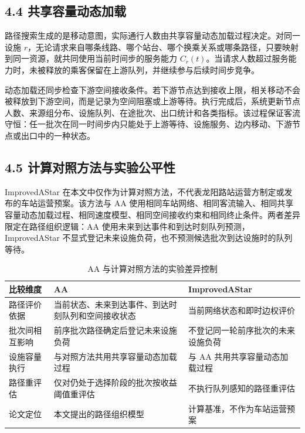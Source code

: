 \documentclass[UTF8,a4paper,12pt]{ctexart}
\begin{document}
\subsection{4.4 共享容量动态加载}

路径搜索生成的是移动意图，实际通行人数由共享容量动态加载过程决定。对同一设施 \(r\)，无论请求来自哪条线路、哪个站台、哪个换乘关系或哪条路径，只要映射到同一资源，就共同使用当前时间步的服务能力 \(C_r(t)\)。当请求人数超过服务能力时，未被释放的乘客保留在上游队列，并继续参与后续时间步竞争。

动态加载还同步检查下游空间接收条件。若下游节点达到接收上限，相关移动不会被释放到下游空间，而是记录为空间阻塞或上游等待。执行完成后，系统更新节点人数、来源组分布、设施队列、在途批次、出口统计和各类指标。该过程保证客流守恒：任一批次在同一时间步内只能处于上游等待、设施服务、边内移动、下游节点或出口中的一种状态。

\subsection{4.5 计算对照方法与实验公平性}

ImprovedAStar 在本文中仅作为计算对照方法，不代表龙阳路站运营方制定或发布的车站运营预案。该方法与 AA 使用相同车站网络、相同客流输入、相同共享容量动态加载过程、相同速度模型、相同空间接收约束和相同终止条件。两者差异限定在路径组织逻辑：AA 使用未来到达事件和到达时刻队列预测，ImprovedAStar 不显式登记未来设施负荷，也不预测候选批次到达设施时的队列等待。

\begin{table}[htbp]
\centering
\caption{AA 与计算对照方法的实验差异控制}
\small
\begin{tabular}{p{}p{}p{}}
\toprule
比较维度 & AA & ImprovedAStar \\
\midrule
路径评价依据 & 当前状态、未来到达事件、到达时刻队列和空间接收状态 & 当前网络状态和即时边权评价 \\
批次间相互影响 & 前序批次路径确定后登记未来设施负荷 & 不登记同一轮前序批次的未来设施负荷 \\
设施容量执行 & 与对照方法共用共享容量动态加载过程 & 与 AA 共用共享容量动态加载过程 \\
路径重评估 & 仅对仍处于选择阶段的批次按收益阈值重评估 & 不执行队列感知的路径重评估 \\
论文定位 & 本文提出的路径组织模型 & 计算基准，不作为车站运营预案 \\
\bottomrule
\end{tabular}
\end{table}
\end{document}
